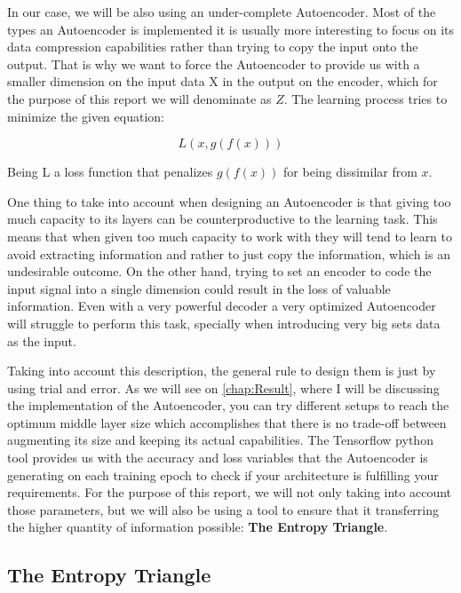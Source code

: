 In our case, we will be also using an under-complete Autoencoder. Most of the types an Autoencoder is implemented it is usually more interesting to focus on its data compression capabilities rather than trying to copy the input onto the output. That is why we want to force the Autoencoder to provide us with a smaller dimension on the input data X in the output on the encoder, which for the purpose of this report we will denominate as $Z$. The learning process tries to minimize the given equation: \par

\begin{equation}\label{eq:artificial neuron}
L(x,g(f(x)))
\end{equation}

Being L a loss function that penalizes $g(f(x))$ for being dissimilar from $x$.

One thing to take into account when designing an Autoencoder is that giving too much capacity to its layers can be counterproductive to the learning task. This means that when given too much capacity to work with they will tend to learn to avoid extracting information and rather to just copy the information, which is an undesirable outcome. On the other hand, trying to set an encoder to code the input signal into a single dimension could result in the loss of valuable information. Even with a very powerful decoder a very optimized Autoencoder will struggle to perform this task, specially when introducing very big sets data as the input. \par

Taking into account this description, the general rule to design them is just by using trial and error. As we will see on \ref{chap:Result}, where I will be discussing the implementation of the Autoencoder, you can try different setups to reach the optimum middle layer size which accomplishes that there is no trade-off between augmenting its size and keeping its actual capabilities. The Tensorflow python tool provides us with the accuracy and loss variables that the Autoencoder is generating on each training epoch to check if your architecture is fulfilling your requirements. For the purpose of this report, we will not only taking into account those parameters, but we will also be using a tool to ensure that it transferring the higher quantity of information possible: \textbf{The Entropy Triangle}.

\subsection{The Entropy Triangle}
